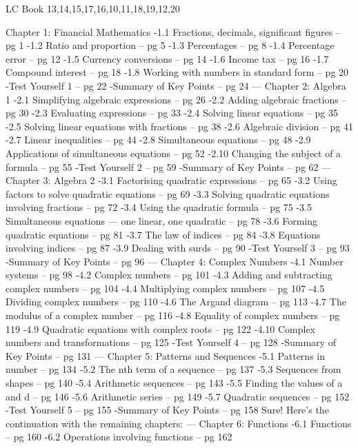 LC Book
13,14,15,17,16,10,11,18,19,12,20



Chapter 1: Financial Mathematics  
-1.1 Fractions, decimals, significant figures – pg 1  
-1.2 Ratio and proportion – pg 5  
-1.3 Percentages – pg 8  
-1.4 Percentage error – pg 12  
-1.5 Currency conversions – pg 14  
-1.6 Income tax – pg 16  
-1.7 Compound interest – pg 18  
-1.8 Working with numbers in standard form – pg 20  
-Test Yourself 1 – pg 22  
-Summary of Key Points – pg 24
---
Chapter 2: Algebra 1  
-2.1 Simplifying algebraic expressions – pg 26  
-2.2 Adding algebraic fractions – pg 30  
-2.3 Evaluating expressions – pg 33  
-2.4 Solving linear equations – pg 35  
-2.5 Solving linear equations with fractions – pg 38  
-2.6 Algebraic division – pg 41  
-2.7 Linear inequalities – pg 44  
-2.8 Simultaneous equations – pg 48  
-2.9 Applications of simultaneous equations – pg 52  
-2.10 Changing the subject of a formula – pg 55  
-Test Yourself 2 – pg 59  
-Summary of Key Points – pg 62
---
Chapter 3: Algebra 2  
-3.1 Factorising quadratic expressions – pg 65  
-3.2 Using factors to solve quadratic equations – pg 69  
-3.3 Solving quadratic equations involving fractions – pg 72  
-3.4 Using the quadratic formula – pg 75  
-3.5 Simultaneous equations — one linear, one quadratic – pg 78  
-3.6 Forming quadratic equations – pg 81  
-3.7 The law of indices – pg 84  
-3.8 Equations involving indices – pg 87  
-3.9 Dealing with surds – pg 90  
-Test Yourself 3 – pg 93  
-Summary of Key Points – pg 96
---
Chapter 4: Complex Numbers  
-4.1 Number systems – pg 98  
-4.2 Complex numbers – pg 101  
-4.3 Adding and subtracting complex numbers – pg 104  
-4.4 Multiplying complex numbers – pg 107  
-4.5 Dividing complex numbers – pg 110  
-4.6 The Argand diagram – pg 113  
-4.7 The modulus of a complex number – pg 116  
-4.8 Equality of complex numbers – pg 119  
-4.9 Quadratic equations with complex roots – pg 122  
-4.10 Complex numbers and transformations – pg 125  
-Test Yourself 4 – pg 128  
-Summary of Key Points – pg 131
---
Chapter 5: Patterns and Sequences  
-5.1 Patterns in number – pg 134  
-5.2 The nth term of a sequence – pg 137  
-5.3 Sequences from shapes – pg 140  
-5.4 Arithmetic sequences – pg 143  
-5.5 Finding the values of a and d – pg 146  
-5.6 Arithmetic series – pg 149  
-5.7 Quadratic sequences – pg 152  
-Test Yourself 5 – pg 155  
-Summary of Key Points – pg 158
Sure! Here’s the continuation with the remaining chapters:
---
Chapter 6: Functions  
-6.1 Functions – pg 160  
-6.2 Operations involving functions – pg 162  
